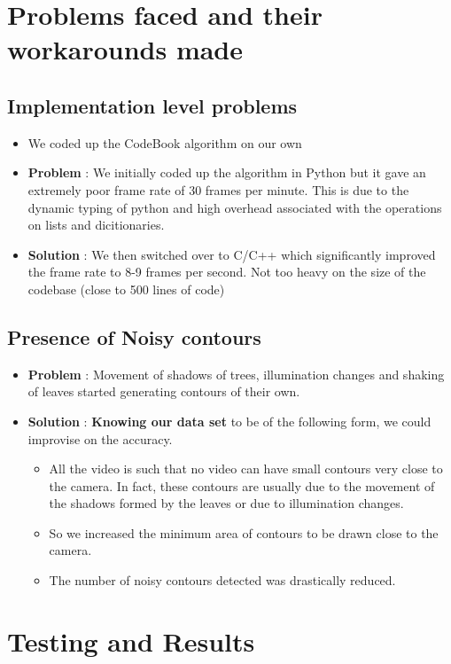 \documentclass[12pt,a4paper]{article}
\begin{document}
\section{Problems faced and their workarounds made}
\subsection{Implementation level problems}
\begin{itemize}
\item We coded up the CodeBook algorithm on our own
\item \textbf{Problem} : We initially coded up the algorithm in Python but it gave an extremely poor frame rate of 30 frames per minute. This is due to the dynamic typing of python and high overhead associated with the operations on lists and dicitionaries. 
\item \textbf{Solution} : We then switched over to C/C++ which significantly improved the frame rate to 8-9 frames per second. Not too heavy on the size of the codebase (close to 500 lines of code)
\end{itemize}

\subsection{Presence of Noisy contours}
\begin{itemize}
\item \textbf{Problem} : Movement of shadows of trees, illumination changes and shaking of leaves started generating contours of their own.
\item \textbf{Solution} : \textbf{Knowing our data set} to be of the following form, we could improvise on the accuracy.
    \begin{itemize}
    \item All the video is such that no video can have small contours very close to the camera. In fact, these contours are usually due to the movement of the shadows formed by the leaves or due to illumination changes.
    \item So we increased the minimum area of contours to be drawn close to the camera.
    \item The number of noisy contours detected was drastically reduced.
    \end{itemize}
\end{itemize}

\section{Testing and Results}
\end{document}
